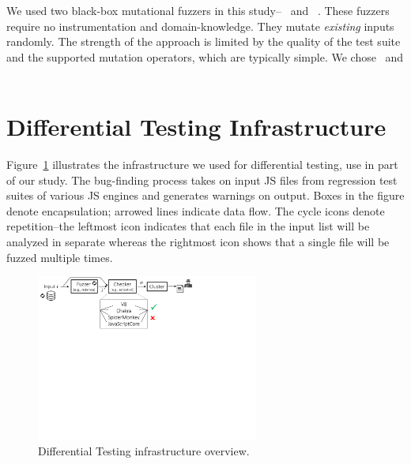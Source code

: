 \documentclass[10pt,conference,anonymous]{IEEEtran}
\begin{document}
We used two black-box mutational fuzzers in this
study--\radamsa~\cite{radamsa} and \quickfuzz~\cite{quickfuzz}. These
fuzzers require no instrumentation and domain-knowledge. They mutate
\emph{existing} inputs randomly. The strength of the approach is
limited by the quality of the test suite and the supported mutation
operators, which are typically simple. We chose \radamsa\ and
\quickfuzz\  

\section{Differential Testing Infrastructure}
\label{sec:design}


Figure~\ref{fig:workflow} illustrates the infrastructure we used for
differential testing, use in part of our study. The bug-finding
process takes on input JS files from regression test suites of various
JS engines and generates warnings on output. Boxes in the figure
denote encapsulation; arrowed lines indicate data flow. The cycle
icons denote repetition--the leftmost icon indicates that each file in
the input list will be analyzed in separate whereas the rightmost icon
shows that a single file will be fuzzed multiple times.

\begin{figure}[t!]
  \centering
  \includegraphics[trim=0 350 0 0,clip,width=0.65\textwidth]{diff-testing-runtimes}
  \caption{\label{fig:workflow}Differential Testing infrastructure overview.}
\end{figure}
\end{document}
